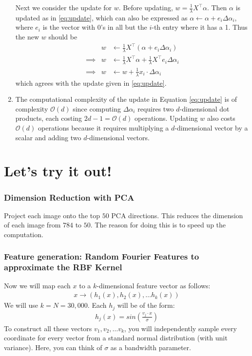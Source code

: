 \documentclass{article}
\begin{document}
\begin{enumerate}
	Next we consider the update for $w$. Before updating, $w=\tfrac1\lambda X^\top \alpha$. Then $\alpha$ is updated as in \eqref{eq:update}, which can also be expressed as $\alpha\leftarrow \alpha + e_i\Delta\alpha_i$, where $e_i$ is the vector with 0's in all but the $i$-th entry where it has a 1. Thus the new $w$ should be
	\begin{equation}
		\begin{array}{crl}
		&w&\leftarrow \tfrac1\lambda X^\top(\alpha+e_i\Delta\alpha_i)\\
		\implies&w&\leftarrow \tfrac1\lambda X^\top\alpha + \tfrac1\lambda X^\top e_i\Delta\alpha_i\\
		\implies&w&\leftarrow w + \tfrac1\lambda x_i\cdot\Delta\alpha_i
		\end{array}
	\end{equation}
	which agrees with the update given in \eqref{eq:update}.

	\item The computational complexity of the update in Equation \eqref{eq:update} is of complexity $\mathcal{O}(d)$ since computing $\Delta \alpha_i$ requires two $d$-dimensional dot products, each costing $2d-1=\mathcal{O}(d)$ operations. Updating $w$ also costs $\mathcal{O}(d)$ operations because it requires multiplying a $d$-dimensional vector by a scalar and adding two $d$-dimensional vectors.
\end{enumerate}


\section{Let's try it out!}
\subsubsection*{Dimension Reduction with PCA}

Project each image onto the top $50$ PCA directions. This reduces the dimension of each image from $784$ to $50$. The reason for doing this is to speed up the computation.

\subsubsection*{Feature generation: Random Fourier Features to approximate the RBF Kernel}
Now we will map each $x$ to a $k$-dimensional feature vector as follows:
\begin{align}
	x \rightarrow (h_1(x), h_2(x), \ldots h_k(x))
\end{align}
We will use $k=N=30,000$.  Each $h_j$ will be of the form:
\begin{align}
	h_j(x) = sin\left(\frac{v_j \cdot x}{\sigma}\right)
\end{align}
To construct all these vectors $v_1, v_2,\ldots v_k$, you will independently sample every coordinate for every vector from a standard normal distribution (with unit variance). Here, you can think of $\sigma$ as a bandwidth parameter.
\end{document}
